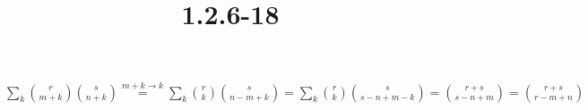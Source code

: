 \documentclass{article}
\title{1.2.6-18}
\begin{document}
\maketitle

$\sum_k \binom{r}{m+k}\binom{s}{n+k} \overset{m + k \to k}{=} \sum_k \binom{r}{k}\binom{s}{n-m+k} = \sum_k \binom{r}{k}\binom{s}{s-n+m-k} = \binom{r+s}{s-n+m} = \binom{r+s}{r-m+n}$
\end{document}
